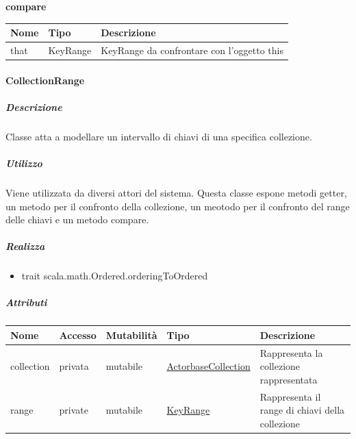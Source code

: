 \documentclass{scalatekids-article}
\begin{document}
\begin{center}
  \textbf{compare}\\
\end{center}
\begin{tabular}{| l | l | l |}
  \hline
  Nome & Tipo & Descrizione\\
  \hline
  that & KeyRange & KeyRange da confrontare con l'oggetto this \\
  \hline
\end{tabular}


\paragraph{CollectionRange}
\label{sec:actorbase::actorsystem::utils::CollectionRange}

\subparagraph{Descrizione}
Classe atta a modellare un intervallo di chiavi di una specifica collezione.

\subparagraph{Utilizzo}
Viene utilizzata da diversi attori del sistema. Questa classe espone metodi
getter, un metodo per il confronto della collezione, un meotodo per il
confronto del range delle chiavi e un metodo compare.

\subparagraph{Realizza}
\begin{itemize}
\item trait scala.math.Ordered.orderingToOrdered
\end{itemize}

\subparagraph{Attributi}
\begin{tabular}{| p{3cm} | p{1.5cm} | p{2cm} | p{2cm} | p{8.5cm} |}
  \hline
  Nome & Accesso & Mutabilità & Tipo & Descrizione\\
  \hline
  collection & privata & mutabile & \hyperref[sec:actorbase::actorsystem::utils::ActorbaseCollection]{ActorbaseCollection} & Rappresenta la collezione rappresentata \\
  \hline
  range & private & mutabile & \hyperref[sec:actorbase::actorsystem::utils::KeyRange]{KeyRange} & Rappresenta il range di chiavi della collezione \\
  \hline
\end{tabular}
\end{document}
